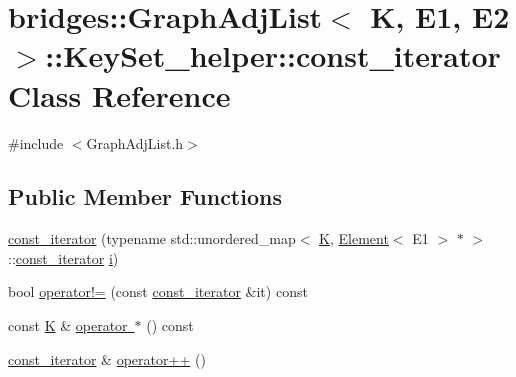 \hypertarget{classbridges_1_1_graph_adj_list_1_1_key_set__helper_1_1const__iterator}{}\section{bridges\+::Graph\+Adj\+List$<$ K, E1, E2 $>$\+::Key\+Set\+\_\+helper\+::const\+\_\+iterator Class Reference}
\label{classbridges_1_1_graph_adj_list_1_1_key_set__helper_1_1const__iterator}


{\ttfamily \#include $<$Graph\+Adj\+List.\+h$>$}

\subsection*{Public Member Functions}
\begin{DoxyCompactItemize}
\item 
\mbox{\hyperlink{classbridges_1_1_graph_adj_list_1_1_key_set__helper_1_1const__iterator_abb8d984914cd0d4cdd75d1776adade9a}{const\+\_\+iterator}} (typename std\+::unordered\+\_\+map$<$ \mbox{\hyperlink{namespacebridges_acfb0a4f7877d8f63de3e6862004c50edaa5f3c6a11b03839d46af9fb43c97c188}{K}}, \mbox{\hyperlink{classbridges_1_1_element}{Element}}$<$ E1 $>$ $\ast$ $>$\+::\mbox{\hyperlink{classbridges_1_1_graph_adj_list_1_1_key_set__helper_1_1const__iterator}{const\+\_\+iterator}} \mbox{\hyperlink{namespacebridges_acfb0a4f7877d8f63de3e6862004c50eda865c0c0b4ab0e063e5caa3387c1a8741}{i}})
\item 
bool \mbox{\hyperlink{classbridges_1_1_graph_adj_list_1_1_key_set__helper_1_1const__iterator_a519b936d0ce2ff34c587a43b1a3e7a62}{operator!=}} (const \mbox{\hyperlink{classbridges_1_1_graph_adj_list_1_1_key_set__helper_1_1const__iterator}{const\+\_\+iterator}} \&it) const
\item 
const \mbox{\hyperlink{namespacebridges_acfb0a4f7877d8f63de3e6862004c50edaa5f3c6a11b03839d46af9fb43c97c188}{K}} \& \mbox{\hyperlink{classbridges_1_1_graph_adj_list_1_1_key_set__helper_1_1const__iterator_ad8ae80a2fcc8b7d997eb0228dc94bbdd}{operator $\ast$}} () const
\item 
\mbox{\hyperlink{classbridges_1_1_graph_adj_list_1_1_key_set__helper_1_1const__iterator}{const\+\_\+iterator}} \& \mbox{\hyperlink{classbridges_1_1_graph_adj_list_1_1_key_set__helper_1_1const__iterator_a9fa08ff89640b3347c15a3858664cfdc}{operator++}} ()
\end{DoxyCompactItemize}


